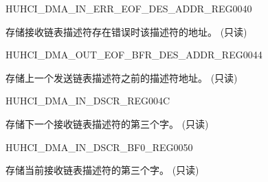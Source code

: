 \begin{register}{H}{UHCI\_DMA\_IN\_ERR\_EOF\_DES\_ADDR\_REG}{\hexprefix{}0040}\label{regdesc:UHCIDMAINERREOFDESADDRREG}
%
\regnewline%
\begin{regdesc}\begin{reglist}
\label{fielddesc:UHCIINERREOFDESADDR}\item [UHCI\_IN\_ERR\_EOF\_DES\_ADDR] 存储接收链表描述符存在错误时该描述符的地址。 (只读)
\end{reglist}\end{regdesc}
\end{register}


\begin{register}{H}{UHCI\_DMA\_OUT\_EOF\_BFR\_DES\_ADDR\_REG}{\hexprefix{}0044}\label{regdesc:UHCIDMAOUTEOFBFRDESADDRREG}
%
\regnewline%
\begin{regdesc}\begin{reglist}
\label{fielddesc:UHCIOUTEOFBFRDESADDR}\item [UHCI\_OUT\_EOF\_BFR\_DES\_ADDR] 存储上一个发送链表描述符之前的描述符地址。 (只读)
\end{reglist}\end{regdesc}
\end{register}


\begin{register}{H}{UHCI\_DMA\_IN\_DSCR\_REG}{\hexprefix{}004C}\label{regdesc:UHCIDMAINDSCRREG}
%
\regnewline%
\begin{regdesc}\begin{reglist}
\label{fielddesc:UHCIINLINKDSCR}\item [UHCI\_INLINK\_DSCR] 存储下一个接收链表描述符的第三个字。 (只读)
\end{reglist}\end{regdesc}
\end{register}


\begin{register}{H}{UHCI\_DMA\_IN\_DSCR\_BF0\_REG}{\hexprefix{}0050}\label{regdesc:UHCIDMAINDSCRBF0REG}
%
\regnewline%
\begin{regdesc}\begin{reglist}
\label{fielddesc:UHCIINLINKDSCRBF0}\item [UHCI\_INLINK\_DSCR\_BF0] 存储当前接收链表描述符的第三个字。 (只读)
\end{reglist}\end{regdesc}
\end{register}


